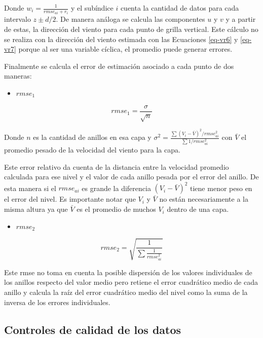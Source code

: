 \documentclass[12pt,spanish,oneside]{book}
\providecommand{\tightlist}{%
  \setlength{\itemsep}{0pt}\setlength{\parskip}{0pt}}
\begin{document}
Donde \(w_i = \frac {1}{rmse_{ai} + r_i}\) y el subíndice \(i\) cuenta
la cantidad de datos para cada intervalo \(z \pm d/2\). De manera
análoga se calcula las componentes \(u\) y \(v\) y a partir de estas, la
dirección del viento para cada punto de grilla vertical. Este cálculo no
se realiza con la dirección del viento estimada con las Ecuaciones
\ref{eq-vr6} y \ref{eq-vr7} porque al ser una variable cíclica, el
promedio puede generar errores.

Finalmente se calcula el error de estimación asociado a cada punto de
dos maneras:

\begin{itemize}
\tightlist
\item
  \textbf{\(rmse_1\)}
\end{itemize}

\begin{equation}\label{eq-vr10} 
rmse_1 = \frac{\sigma}{\sqrt{n}}
\end{equation}

Donde \(n\) es la cantidad de anillos en esa capa y
\(\sigma^{2}= \frac{\sum (V_i - \bar{V})^2 /rmse_{ai}^2}{\sum 1/rmse_{ai}^2}\)
con \(\bar{V}\) el promedio pesado de la velocidad del viento para la
capa.

Este error relativo da cuenta de la distancia entre la velocidad
promedio calculada para ese nivel y el valor de cada anillo pesada por
el error del anillo. De esta manera si el \(rmse_{ai}\) es grande la
diferencia \((V_i - \bar{V})^2\) tiene menor peso en el error del nivel.
Es importante notar que \(V_i\) y \(\bar{V}\) no están necesariamente a
la misma altura ya que \(\bar{V}\) es el promedio de muchos \(V_i\)
dentro de una capa.

\begin{itemize}
\tightlist
\item
  \textbf{\(rmse_2\)}
\end{itemize}

\begin{equation}\label{eq-vr11}
rmse_2 = \sqrt{\frac{1}{\sum \frac{1}{rmse_{ai}^2}}}
\end{equation}

Este rmse no toma en cuenta la posible dispersión de los valores
individuales de los anillos respecto del valor medio pero retiene el
error cuadrático medio de cada anillo y calcula la raíz del error
cuadrático medio del nivel como la suma de la inversa de los errores
individuales.

\subsection{Controles de calidad de los
datos}\label{controles-de-calidad-de-los-datos}
\end{document}
